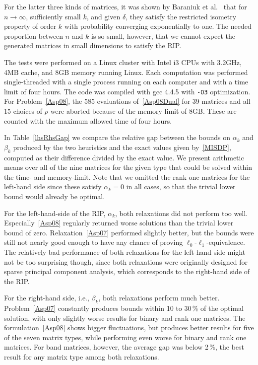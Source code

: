 \documentclass[journal]{IEEEtran}
\begin{document}
For the latter three kinds of matrices, it was shown by Baraniuk et al.~\cite{BDDW08} that for $n \rightarrow \infty$, 
sufficiently small $k$, and given $\delta$, they satisfy the restricted isometry property of order $k$  
with probability converging exponentially to one. The needed proportion between $n$ and $k$ is so small, however,
that we cannot expect the generated matrices in small dimensions to satisfy the RIP.

The tests were performed on a Linux cluster with Intel i3 CPUs with 3.2GHz, 4MB cache, and 8GB memory running
Linux. Each computation was performed single-threaded with a single process running on each computer and with 
a time limit of four hours. The code was compiled with gcc 4.4.5 with \texttt{-O3} optimization. For 
Problem~\eqref{Asp08}, the 585 evaluations of~\eqref{Asp08Dual} for 39 matrices and all 15 choices of $\rho$
were aborted because of the memory limit of 8GB. These are counted with the maximum allowed time of four hours. 

In Table~\ref{lhsRhsGap} we compare the relative gap between the bounds on $\alpha_k$ and $\beta_k$ produced by the two heuristics
and the exact values given by~\eqref{MISDP}, computed as their difference divided by the exact value. We present arithmetic means over all of the nine matrices for the given type that
could be solved within the time- and memory-limit. Note that we omitted the rank one matrices for the left-hand side since these satisfy
$\alpha_k = 0$ in all cases, so that the trivial lower bound would already be optimal.

For the left-hand-side of the RIP, $\alpha_k$, both relaxations did not perform
too well. Especially~\eqref{Asp08} regularly returned worse solutions than the
trivial lower bound of zero. Relaxation~\eqref{Asp07} performed slightly better, but the bounds
were still not nearly good enough to have any chance of proving $\ell_0$-$\ell_1$-equivalence. The relatively
bad performance of both relaxations for the left-hand side might not be too surprising though, since both relaxations
were originally designed for sparse principal component analysis, which corresponds to the right-hand side
of the RIP.



For the right-hand side, i.e., $\beta_k$,  both relaxations
perform much better. Problem~\eqref{Asp07} constantly produces bounds within 10 to 30\,\% of the optimal
solution, with only slightly worse results for binary and rank one matrices. The formulation~\eqref{Asp08}
shows bigger fluctuations, but produces better results for five of the seven matrix types, while performing even
worse for binary and rank one matrices. For band matrices, however, the average gap was below 2\,\%, the best 
result for any matrix type among both relaxations.
\end{document}
